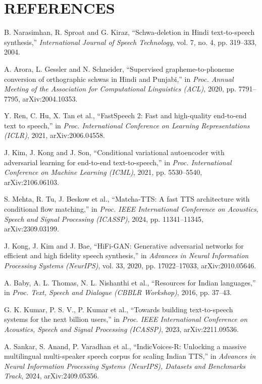 \documentclass[12pt,a4paper]{article}
\begin{document}
\section*{REFERENCES}
\begin{singlespace}
\begin{enumerate}[label={[\arabic*]},leftmargin=2.3em,itemsep=3pt,topsep=4pt]
  \item B. Narasimhan, R. Sproat and G. Kiraz, “Schwa-deletion in Hindi text-to-speech synthesis,” \textit{International Journal of Speech Technology}, vol. 7, no. 4, pp. 319–333, 2004.
  \item A. Arora, L. Gessler and N. Schneider, “Supervised grapheme-to-phoneme conversion of orthographic schwas in Hindi and Punjabi,” in \textit{Proc. Annual Meeting of the Association for Computational Linguistics (ACL)}, 2020, pp. 7791–7795, arXiv:2004.10353.
  \item Y. Ren, C. Hu, X. Tan et al., “FastSpeech 2: Fast and high-quality end-to-end text to speech,” in \textit{Proc. International Conference on Learning Representations (ICLR)}, 2021, arXiv:2006.04558.
  \item J. Kim, J. Kong and J. Son, “Conditional variational autoencoder with adversarial learning for end-to-end text-to-speech,” in \textit{Proc. International Conference on Machine Learning (ICML)}, 2021, pp. 5530–5540, arXiv:2106.06103.
  \item S. Mehta, R. Tu, J. Beskow et al., “Matcha-TTS: A fast TTS architecture with conditional flow matching,” in \textit{Proc. IEEE International Conference on Acoustics, Speech and Signal Processing (ICASSP)}, 2024, pp. 11341–11345, arXiv:2309.03199.
  \item J. Kong, J. Kim and J. Bae, “HiFi-GAN: Generative adversarial networks for efficient and high fidelity speech synthesis,” in \textit{Advances in Neural Information Processing Systems (NeurIPS)}, vol. 33, 2020, pp. 17022–17033, arXiv:2010.05646.
  \item A. Baby, A. L. Thomas, N. L. Nishanthi et al., “Resources for Indian languages,” in \textit{Proc. Text, Speech and Dialogue (CBBLR Workshop)}, 2016, pp. 37–43.
  \item G. K. Kumar, P. S. V., P. Kumar et al., “Towards building text-to-speech systems for the next billion users,” in \textit{Proc. IEEE International Conference on Acoustics, Speech and Signal Processing (ICASSP)}, 2023, arXiv:2211.09536.
  \item A. Sankar, S. Anand, P. Varadhan et al., “IndicVoices-R: Unlocking a massive multilingual multi-speaker speech corpus for scaling Indian TTS,” in \textit{Advances in Neural Information Processing Systems (NeurIPS), Datasets and Benchmarks Track}, 2024, arXiv:2409.05356.

\end{enumerate}
\end{singlespace}
\end{document}
